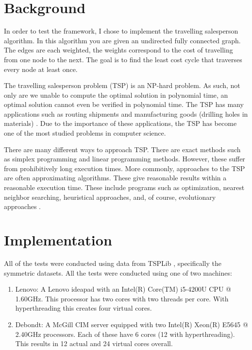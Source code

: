 \documentclass[10pt,letterpaper]{article}
\begin{document}
\section{Background}
In order to test the framework, I chose to implement the travelling salesperson algorithm. In this algorithm you are given an undirected fully connected graph. The edges are each weighted, the weights correspond to the cost of travelling from one node to the next. The goal is to find the least cost cycle that traverses every node at least once. 

The travelling salesperson problem (TSP) is an NP-hard problem. As such, not only are we unable to compute the optimal solution in polynomial time, an optimal solution cannot even be verified in polynomial time. The TSP has many applications such as routing shipments and manufacturing goods (drilling holes in materials) \cite{tspuses}. Due to the importance of these applications, the TSP has become one of the most studied problems in computer science.

There are many different ways to approach TSP. There are exact methods such as simplex programming and linear programming methods. However, these suffer from prohibitively long execution times. More commonly, approaches to the TSP are often approximating algorithms. These give reasonable results within a reasonable execution time. These include programs such as optimization, nearest neighbor searching, heuristical approaches, and, of course, evolutionary approaches \cite{matai2010traveling}. 


\section{Implementation} \label{sec:implementation}
All of the tests were conducted using data from TSPLib \cite{tsplib}, specifically the symmetric datasets. All the tests were conducted using one of two machines:
\begin{enumerate}
\item Lenovo: A Lenovo ideapad with an Intel(R) Core(TM) i5-4200U CPU @ 1.60GHz. This processor has two cores with two threads per core. With hyperthreading this creates four virtual cores. 
\item Debondt: A McGill CIM server equipped with two Intel(R) Xeon(R) E5645 @ 2.40GHz processors. Each of these have 6 cores (12 with hyperthreading). This results in 12 actual and 24 virtual cores overall. 
\end{enumerate}
\end{document}
